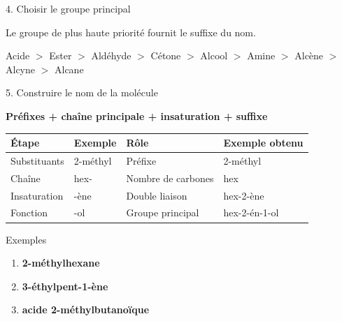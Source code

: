 \documentclass[a4paper,11pt]{article}
\begin{document}

\begin{sectionbox}[orangebox]{4. Choisir le groupe principal}

Le groupe de plus haute priorité fournit le suffixe du nom.

\vspace{0.3cm}

\begin{center}
\Large
Acide $>$ Ester $>$ Aldéhyde $>$ Cétone $>$ Alcool $>$ Amine $>$ Alcène $>$ Alcyne $>$ Alcane
\end{center}

\end{sectionbox}

\vspace{0.3cm}


\begin{sectionbox}[cyanbox]{5. Construire le nom de la molécule}

\begin{center}
\Large
\textbf{Préfixes + chaîne principale + insaturation + suffixe}
\end{center}

\vspace{0.4cm}

\begin{tabularx}{\linewidth}{|X|X|X|X|}
\hline
\textbf{Étape} & \textbf{Exemple} & \textbf{Rôle} & \textbf{Exemple obtenu} \\
\hline
Substituants & 2-méthyl & Préfixe & 2-méthyl \\
\hline
Chaîne & hex- & Nombre de carbones & hex \\
\hline
Insaturation & -ène & Double liaison & hex-2-ène \\
\hline
Fonction & -ol & Groupe principal & hex-2-én-1-ol \\
\hline
\end{tabularx}

\end{sectionbox}

\vspace{0.4cm}


\begin{sectionbox}[lightblue]{Exemples}

\begin{enumerate}
    \item \textbf{2-méthylhexane}
    \item \textbf{3-éthylpent-1-ène}
    \item \textbf{acide 2-méthylbutanoïque}
\end{enumerate}

\end{sectionbox}
\end{document}
